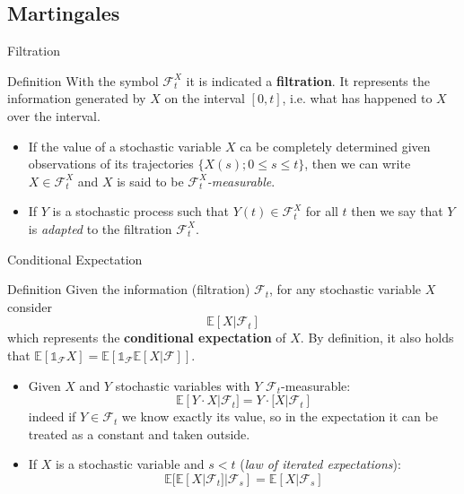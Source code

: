 \documentclass{beamer}
\begin{document}
\subsection{Martingales}
\begin{frame}{Filtration}
	\begin{block}{Definition}
		With the symbol $\mathcal{F}^X_t$ it is indicated a \textbf{filtration}. It represents the information generated by $X$ on the interval $[0, t]$, i.e. what has happened to $X$ over the interval. 
	\end{block}
	\begin{itemize}	
		\item If the value of a stochastic variable $X$ ca be completely determined given observations of its trajectories $\{X(s); 0\leq s \leq t\}$, then we can write $X\in\mathcal{F}_t^X$ and $X$ is said to be $\mathcal{F}_t^X$\emph{-measurable}.
		\item If $Y$ is a stochastic process such that $Y(t)\in\mathcal{F}_t^X$ for all $t$ then we say that $Y$ is \emph{adapted} to the filtration $\mathcal{F}_t^X$. 
	\end{itemize}
\end{frame}

\begin{frame}{Conditional Expectation}
	\begin{block}{Definition}
		Given the information (filtration) $\mathcal{F}_t$, for any stochastic variable $X$ consider
		\begin{equation*}
			\mathbb{E}[X|\mathcal{F}_t]
		\end{equation*}
		which represents the \textbf{conditional expectation} of $X$.
		By definition, it also holds that $\mathbb{E}[\mathbb{1}_{\mathcal{F}}X] = \mathbb{E}[\mathbb{1}_{\mathcal{F}}\mathbb{E}[X|\mathcal{F}]]$.
	\end{block}
	\begin{itemize}
		\item Given $X$ and $Y$ stochastic variables with $Y$ $\mathcal{F}_t$-measurable:
		\begin{equation*}
			\mathbb{E}[Y\cdot X|\mathcal{F}_t] =  Y\cdot\mathbb[X|\mathcal{F}_t]
		\end{equation*}
		indeed if $Y\in\mathcal{F}_t$ we know exactly its value, so in the expectation it can be treated as a constant and taken outside.
		\item If $X$ is a stochastic variable and $s<t$ (\emph{law of iterated expectations}):
		\begin{equation*}
			\mathbb{E}[\mathbb{E}[X|\mathcal{F}_t]|\mathcal{F}_s] = \mathbb{E}[X|\mathcal{F}_s]
		\end{equation*}
	\end{itemize}
\end{frame}
\end{document}
